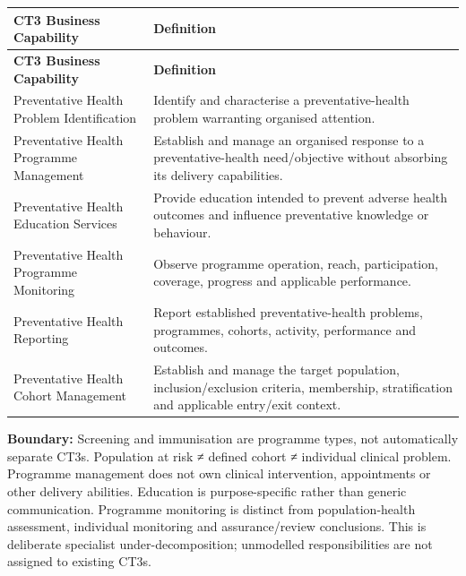 \label{rad:business:579}
\begingroup\small\setlength{\TableWidth}{\dimexpr\linewidth-4\tabcolsep-3\arrayrulewidth\relax}
\begin{longtable}{|>{\raggedright\arraybackslash}p{0.35\TableWidth}|>{\raggedright\arraybackslash}p{0.65\TableWidth}|}
\hline\rowcolor{TableHead}\textbf{CT3 Business Capability} & \textbf{Definition}\\\hline\endfirsthead
\hline\rowcolor{TableHead}\textbf{CT3 Business Capability} & \textbf{Definition}\\\hline\endhead
\hline\endfoot
Preventative Health Problem Identification & Identify and characterise a preventative-health problem warranting organised attention.\\\hline
Preventative Health Programme Management & Establish and manage an organised response to a preventative-health need/\allowbreak{}objective without absorbing its delivery capabilities.\\\hline
Preventative Health Education Services & Provide education intended to prevent adverse health outcomes and influence preventative knowledge or behaviour.\\\hline
Preventative Health Programme Monitoring & Observe programme operation, reach, participation, coverage, progress and applicable performance.\\\hline
Preventative Health Reporting & Report established preventative-health problems, programmes, cohorts, activity, performance and outcomes.\\\hline
Preventative Health Cohort Management & Establish and manage the target population, inclusion/\allowbreak{}exclusion criteria, membership, stratification and applicable entry/\allowbreak{}exit context.\\\hline
\end{longtable}\endgroup
{}\label{rad:business:588}

\textbf{Boundary:} Screening and immunisation are programme types, not automatically separate CT3s. Population at risk ≠ defined cohort ≠ individual clinical problem. Programme management does not own clinical intervention, appointments or other delivery abilities. Education is purpose-specific rather than generic communication. Programme monitoring is distinct from population-health assessment, individual monitoring and assurance/\allowbreak{}review conclusions. This is deliberate specialist under-decomposition; unmodelled responsibilities are not assigned to existing CT3s.

\label{rad:business:590}
